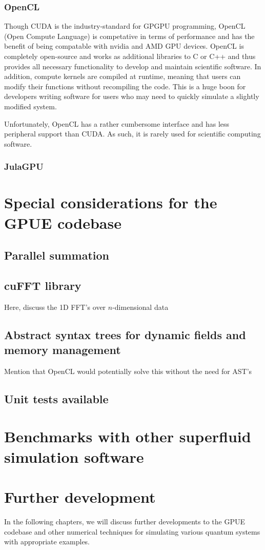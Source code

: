 \subsubsection{OpenCL}

Though CUDA is the industry-standard for GPGPU programming, OpenCL (Open Compute Language) is competative in terms of performance and has the benefit of being compatable with nvidia and AMD GPU devices.
OpenCL is completely open-source and works as additional libraries to C or C++ and thus provides all necessary functionality to develop and maintain scientific software.
In addition, compute kernels are compiled at runtime, meaning that users can modify their functions without recompiling the code.
This is a huge boon for developers writing software for users who may need to quickly simulate a slightly modified system.

Unfortunately, OpenCL has a rather cumbersome interface and has less peripheral support than CUDA.
As such, it is rarely used for scientific computing software.

\subsubsection{JulaGPU}

\section{Special considerations for the GPUE codebase}

\subsection{Parallel summation}

\subsection{cuFFT library}

Here, discuss the 1D FFT's over $n$-dimensional data

\subsection{Abstract syntax trees for dynamic fields and memory management}

Mention that OpenCL would potentially solve this without the need for AST's

\subsection{Unit tests available}

\section{Benchmarks with other superfluid simulation software}

\section{Further development}
In the following chapters, we will discuss further developments to the GPUE codebase and other numerical techniques for simulating various quantum systems with appropriate examples.
